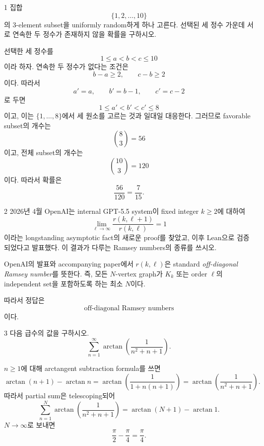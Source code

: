 
\begin{problem}{1}
집합
\[
    \{1,2,\ldots,10\}
\]
의 $3$-element subset을 uniformly random하게 하나 고른다. 선택된 세 정수 가운데 서로 연속한 두 정수가 존재하지 않을 확률을 구하시오.
\end{problem}

\begin{solution}
선택한 세 정수를
\[
    1\leq a<b<c\leq10
\]
이라 하자. 연속한 두 정수가 없다는 조건은
\[
    b-a\geq2,
    \qquad
    c-b\geq2
\]
이다. 따라서
\[
    a'=a,
    \qquad
    b'=b-1,
    \qquad
    c'=c-2
\]
로 두면
\[
    1\leq a'<b'<c'\leq8
\]
이고, 이는 $\{1,\ldots,8\}$에서 세 원소를 고르는 것과 일대일 대응한다. 그러므로 favorable subset의 개수는
\[
    \binom83=56
\]
이고, 전체 subset의 개수는
\[
    \binom{10}{3}=120
\]
이다. 따라서 확률은
\[
    \boxed{\frac{56}{120}=\frac{7}{15}}.
\]
\end{solution}

\begin{problem}{2}
2026년 4월 OpenAI는 internal GPT-5.5 system이 fixed integer $k\geq2$에 대하여
\[
    \lim_{\ell\to\infty}
    \frac{r(k,\ell+1)}{r(k,\ell)}
    =1
\]
이라는 longstanding asymptotic fact의 새로운 proof를 찾았고, 이후 Lean으로 검증되었다고 발표했다. 이 결과가 다루는 Ramsey numbers의 종류를 쓰시오.
\end{problem}

\begin{solution}
OpenAI의 발표와 accompanying paper에서 $r(k,\ell)$은 standard \emph{off-diagonal Ramsey number}를 뜻한다. 즉, 모든 $N$-vertex graph가 $K_k$ 또는 order $\ell$의 independent set을 포함하도록 하는 최소 $N$이다.

따라서 정답은
\[
    \boxed{\text{off-diagonal Ramsey numbers}}
\]
이다.
\end{solution}

\begin{problem}{3}
다음 급수의 값을 구하시오.
\[
    \sum_{n=1}^{\infty}
    \arctan\!\left(\frac{1}{n^2+n+1}\right).
\]
\end{problem}

\begin{solution}
$n\geq1$에 대해 arctangent subtraction formula를 쓰면
\[
    \arctan(n+1)-\arctan n
    =
    \arctan\!\left(
        \frac{1}{1+n(n+1)}
    \right)
    =
    \arctan\!\left(\frac{1}{n^2+n+1}\right).
\]
따라서 partial sum은 telescoping되어
\[
    \sum_{n=1}^{N}
    \arctan\!\left(\frac{1}{n^2+n+1}\right)
    =
    \arctan(N+1)-\arctan1.
\]
$N\to\infty$로 보내면
\[
    \boxed{\frac{\pi}{2}-\frac{\pi}{4}=\frac{\pi}{4}}.
\]
\end{solution}

